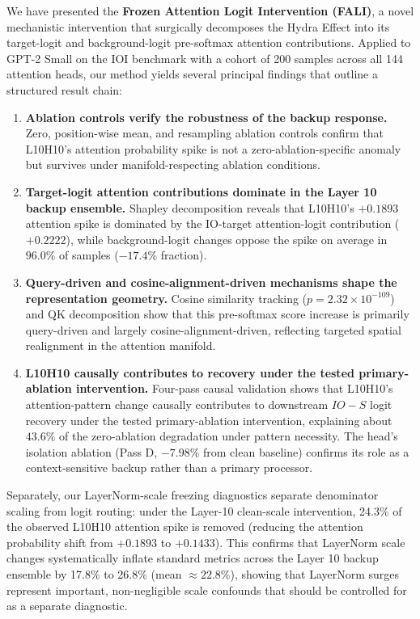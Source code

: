 \documentclass[12pt,a4paper]{article}
\begin{document}
We have presented the \textbf{Frozen Attention Logit Intervention (FALI)}, a
novel mechanistic intervention that surgically decomposes the Hydra Effect into
its target-logit and background-logit pre-softmax attention contributions. Applied
to GPT-2 Small on the IOI benchmark with a cohort of 200 samples across all 144
attention heads, our method yields several principal findings that outline a structured result chain:

\begin{enumerate}
  \item \textbf{Ablation controls verify the robustness of the backup response.} Zero, position-wise mean, and resampling ablation controls confirm that L10H10's attention probability spike is not a zero-ablation-specific anomaly but survives under manifold-respecting ablation conditions.

  \item \textbf{Target-logit attention contributions dominate in the Layer 10 backup ensemble.} Shapley decomposition reveals that L10H10's $+0.1893$ attention spike is dominated by the IO-target attention-logit contribution ($+0.2222$), while background-logit changes oppose the spike on average in $96.0\%$ of samples ($-17.4\%$ fraction).

  \item \textbf{Query-driven and cosine-alignment-driven mechanisms shape the representation geometry.} Cosine similarity tracking ($p = 2.32 \times 10^{-109}$) and QK decomposition show that this pre-softmax score increase is primarily query-driven and largely cosine-alignment-driven, reflecting targeted spatial realignment in the attention manifold.

  \item \textbf{L10H10 causally contributes to recovery under the tested primary-ablation intervention.} Four-pass causal validation shows that L10H10's attention-pattern change causally contributes to downstream $IO - S$ logit recovery under the tested primary-ablation intervention, explaining about $43.6\%$ of the zero-ablation degradation under pattern necessity. The head's isolation ablation (Pass D, $-7.98\%$ from clean baseline) confirms its role as a context-sensitive backup rather than a primary processor.
\end{enumerate}

Separately, our LayerNorm-scale freezing diagnostics separate denominator scaling from logit routing: under the Layer-10 clean-scale intervention, 24.3\% of the observed L10H10 attention spike is removed (reducing the attention probability shift from $+0.1893$ to $+0.1433$). This confirms that LayerNorm scale changes systematically inflate standard metrics across the Layer 10 backup ensemble by 17.8\% to 26.8\% (mean $\approx 22.8\%$), showing that LayerNorm surges represent important, non-negligible scale confounds that should be controlled for as a separate diagnostic.
\end{document}
